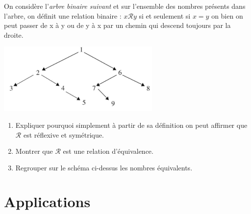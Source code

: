 \documentclass[a4paper,12pt,french]{book}
\begin{document}
\begin{exercice}[]
On considère l'\textit{arbre binaire suivant} et sur l'ensemble des nombres présents dans l'arbre, on définit une relation binaire : $x\mathcal{R}y$ si et seulement si $x=y$ on bien on peut passer de x à y ou de y à x par un chemin qui descend toujours par la droite.
\begin{center}
	\includegraphics[width=8cm]{img/arbre.PNG}
\end{center}
\begin{enumerate}[\bfseries 1.]
	\item 	Expliquer pourquoi simplement à partir de sa définition on peut affirmer que $\mathcal{R}$ est réflexive et symétrique.
	\item 	Montrer que $\mathcal{R}$ est une relation d'équivalence.
	\item 	Regrouper sur le schéma ci-dessus les nombres équivalents.
\end{enumerate}
\end{exercice}





\section{Applications}
\end{document}
